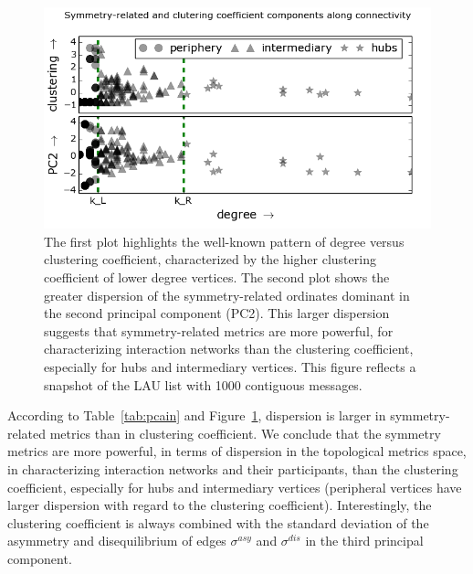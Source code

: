 \documentclass[%
aip,
jmp,%
amsmath,amssymb,
reprint,%
]{revtex4-1}
\begin{document}
\begin{figure} 
\centering
\includegraphics[width=.45\textwidth]{figs/im13PCAPLOT__}
\caption{The first plot highlights the well-known pattern of degree versus clustering coefficient, characterized by the higher clustering coefficient of lower degree vertices.
    The second plot shows the greater dispersion of the symmetry-related ordinates dominant in the second principal component (PC2).
This larger dispersion suggests that symmetry-related metrics are more powerful,
for characterizing interaction networks than the clustering coefficient,
especially for hubs and intermediary vertices.
This figure reflects a snapshot of the LAU list with 1000 contiguous messages.}

\label{fig:sym}
\end{figure}

According to Table~\ref{tab:pcain} and Figure~\ref{fig:sym},
dispersion is larger in symmetry-related metrics than in clustering coefficient.
We conclude that the symmetry metrics are more powerful, in terms of dispersion in the topological metrics space, in characterizing interaction networks and their participants, than the clustering coefficient, especially for hubs and intermediary vertices (peripheral vertices have larger dispersion with regard to the clustering coefficient).
Interestingly, the clustering coefficient is always combined
with the standard deviation of the asymmetry and disequilibrium
of edges $\sigma^{asy}$ and $\sigma^{dis}$ in the third principal component.
\end{document}

